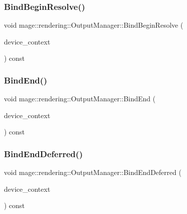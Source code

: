\subsubsection{\texorpdfstring{Bind\+Begin\+Resolve()}{BindBeginResolve()}}
{\footnotesize\ttfamily void mage\+::rendering\+::\+Output\+Manager\+::\+Bind\+Begin\+Resolve (\begin{DoxyParamCaption}\item[{I\+D3\+D11\+Device\+Context \&}]{device\+\_\+context }\end{DoxyParamCaption}) const\hspace{0.3cm}{\ttfamily [noexcept]}}

\hypertarget{classmage_1_1rendering_1_1_output_manager_adf8fa859bb168ecf389d56b574a69dbd}{}\label{classmage_1_1rendering_1_1_output_manager_adf8fa859bb168ecf389d56b574a69dbd} 
\subsubsection{\texorpdfstring{Bind\+End()}{BindEnd()}}
{\footnotesize\ttfamily void mage\+::rendering\+::\+Output\+Manager\+::\+Bind\+End (\begin{DoxyParamCaption}\item[{I\+D3\+D11\+Device\+Context \&}]{device\+\_\+context }\end{DoxyParamCaption}) const\hspace{0.3cm}{\ttfamily [noexcept]}}

\hypertarget{classmage_1_1rendering_1_1_output_manager_af48d4e2671d7b84d3fd94961b926dd2a}{}\label{classmage_1_1rendering_1_1_output_manager_af48d4e2671d7b84d3fd94961b926dd2a} 
\subsubsection{\texorpdfstring{Bind\+End\+Deferred()}{BindEndDeferred()}}
{\footnotesize\ttfamily void mage\+::rendering\+::\+Output\+Manager\+::\+Bind\+End\+Deferred (\begin{DoxyParamCaption}\item[{I\+D3\+D11\+Device\+Context \&}]{device\+\_\+context }\end{DoxyParamCaption}) const\hspace{0.3cm}{\ttfamily [noexcept]}}


